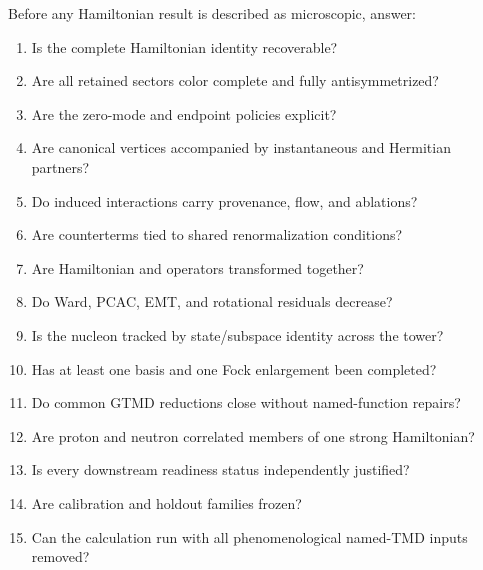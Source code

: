 \documentclass[11pt]{article}
\begin{document}
Before any Hamiltonian result is described as microscopic, answer:
\begin{enumerate}
 \item Is the complete Hamiltonian identity recoverable?
 \item Are all retained sectors color complete and fully antisymmetrized?
 \item Are the zero-mode and endpoint policies explicit?
 \item Are canonical vertices accompanied by instantaneous and Hermitian
 partners?
 \item Do induced interactions carry provenance, flow, and ablations?
 \item Are counterterms tied to shared renormalization conditions?
 \item Are Hamiltonian and operators transformed together?
 \item Do Ward, PCAC, EMT, and rotational residuals decrease?
 \item Is the nucleon tracked by state/subspace identity across the tower?
 \item Has at least one basis and one Fock enlargement been completed?
 \item Do common GTMD reductions close without named-function repairs?
 \item Are proton and neutron correlated members of one strong Hamiltonian?
 \item Is every downstream readiness status independently justified?
 \item Are calibration and holdout families frozen?
 \item Can the calculation run with all phenomenological named-TMD inputs
 removed?
\end{enumerate}
\end{document}
